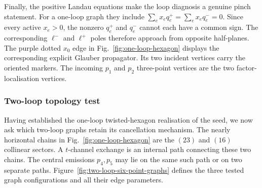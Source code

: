 \documentclass[a4paper,11pt]{article}
\begin{document}
Finally, the positive Landau equations make the loop diagnosis a genuine
pinch statement.  For a one-loop graph they include
\(\sum_e x_eq_e^+=\sum_e x_eq_e^-=0\).  Since every active \(x_e>0\), the
nonzero \(q_e^+\) and \(q_e^-\) cannot each have a common sign.  The
corresponding \(\ell^-\) and \(\ell^+\) poles therefore approach from
opposite half-planes.  The purple dotted \(x_0\) edge in
Fig.~\ref{fig:one-loop-hexagon} displays the corresponding explicit Glauber
propagator.  Its two incident vertices carry the oriented markers.  The incoming
\(p_1\) and \(p_2\) three-point vertices are the two factor-localisation
vertices.

\subsubsection{Two-loop topology test}

Having established the one-loop twisted-hexagon realisation of the seed, we
now ask which two-loop graphs retain its cancellation mechanism.  The nearly horizontal chains in
Fig.~\ref{fig:one-loop-hexagon} are the \((23)\) and \((16)\) collinear
sectors.  A \(t\)-channel exchange is an internal path connecting these two
chains.  The central emissions \(p_4,p_5\) may lie on the same such path or
on two separate paths.  Figure~\ref{fig:two-loop-six-point-graphs} defines
the three tested graph configurations and all their edge parameters.
\end{document}
